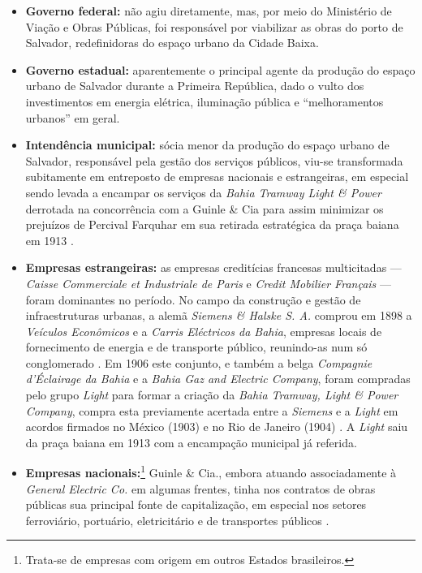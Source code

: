 \begin{itemize}
\item \textbf{Governo federal:} não agiu diretamente, mas, por meio do Ministério de Viação e Obras Públicas, foi responsável por viabilizar as obras do porto de Salvador, redefinidoras do espaço urbano da Cidade Baixa.
\item \textbf{Governo estadual:} aparentemente o principal agente da produção do espaço urbano de Salvador durante a Primeira República, dado o vulto dos investimentos em energia elétrica, iluminação pública e ``melhoramentos urbanos'' em geral.
\item \textbf{Intendência municipal:} sócia menor da produção do espaço urbano de Salvador, responsável pela gestão dos serviços públicos, viu-se transformada subitamente em entreposto de empresas nacionais e estrangeiras, em especial sendo levada a encampar os serviços da \textit{Bahia Tramway Light \& Power} derrotada na concorrência com a Guinle \& Cia para assim minimizar os prejuízos de Percival Farquhar em sua retirada estratégica da praça baiana em 1913 \cite[p.~76-89]{CUNHA2011}. 
\item \textbf{Empresas estrangeiras:} as empresas creditícias francesas multicitadas --- \textit{Caisse Commerciale et Industriale de Paris} e \textit{Credit Mobilier Français} --- foram dominantes no período. No campo da construção e gestão de infraestruturas urbanas, a alemã \textit{Siemens \& Halske S. A.} comprou em 1898 a \textit{Veículos Econômicos} e a \textit{Carris Eléctricos da Bahia}, empresas locais de fornecimento de energia e de transporte público, reunindo-as num só conglomerado \cite[p.~36]{CUNHA2011}. Em 1906 este conjunto, e também a belga \textit{Compagnie d'Éclairage da Bahia} e a \textit{Bahia Gaz and Electric Company}, foram compradas pelo grupo \textit{Light} para formar a criação da \textit{Bahia Tramway, Light \& Power Company}, compra esta previamente acertada entre a \textit{Siemens} e a \textit{Light} em acordos firmados no México (1903) e no Rio de Janeiro (1904) \cite[p.~34]{CUNHA2011}. A \textit{Light} saiu da praça baiana em 1913 com a encampação municipal já referida.
\item \textbf{Empresas nacionais:}\footnote{Trata-se de empresas com origem em outros Estados brasileiros.} Guinle \& Cia., embora atuando associadamente à \textit{General Electric Co.} em algumas frentes, tinha nos contratos de obras públicas sua principal fonte de capitalização, em especial nos setores ferroviário, portuário, eletricitário e de transportes públicos \cite[p.~43-44]{CUNHA2011}.

\end{itemize}
